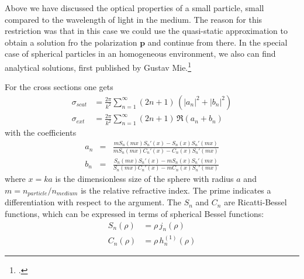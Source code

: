 Above we have discussed the optical properties of a small particle, small compared to the wavelength of light in the medium. The reason for this restriction was that in this case we could use the quasi-static approximation to obtain a solution fro the polarization $\mathbf{p}$ and continue from there. In the special case of spherical particles in an homogeneous environment, we also can find analytical solutions, first published by Gustav Mie.\footcite{BH}

For the cross sections one gets
\begin{eqnarray*}
\sigma_{scat} & = \frac{2 \pi }{k^2} \sum\limits_{n=1}^{\infty} (2 n+1) \, \left( |a_n|^2 + |b_n|^2 \right) \\
\sigma_{ext} & = \frac{2 \pi }{k^2} \sum\limits_{n=1}^{\infty} ( 2n+1)\, \Re \left( a_n + b_n \right) 
\end{eqnarray*}
%
with the coefficients
%
\begin{eqnarray*}
 a_n &= & \frac{m S_n (m x) S_n' (x) - S_n (x) S_n' (m x)}
 {m S_n (m x) C_n' (x) -  C_n (x) S_n' (m x)}  \\
 b_n &=  &\frac{S_n (m x) S_n' (x) - m S_n (x) S_n' (mx)}
  {S_n (mx) C_n' (x) - m C_n (x) S_n' (m x)} 
\end{eqnarray*}
where $x =k a $ is the dimensionless size of the sphere with radius $a$ and $m = n_{particle} / n_{medium}$ is the relative refractive index. The prime indicates a differentiation with respect to the argument. The $S_n$ and $C_n$ are Ricatti-Bessel functions, which can be expressed in terms of spherical Bessel functions:
\begin{eqnarray*}
S_n ( \rho) & = \rho \, j_n (\rho) \\
C_n (\rho)  &= \rho \, h_n^{(1)} (\rho) 
\end{eqnarray*}




\printbibliography[segment=\therefsegment,heading=subbibliography]
